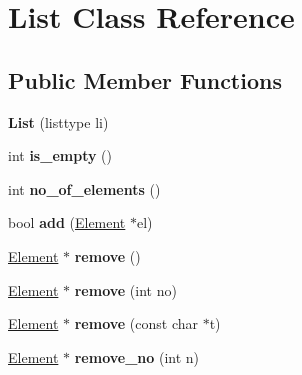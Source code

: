 \hypertarget{class_list}{\section{List Class Reference}
\label{d1/d34/class_list}
}
\subsection*{Public Member Functions}
\begin{DoxyCompactItemize}
\item 
\hypertarget{class_list_afd7e4e5bbb9551737d314733718443e3}{{\bfseries List} (listtype li)}\label{d1/d34/class_list_afd7e4e5bbb9551737d314733718443e3}

\item 
\hypertarget{class_list_a52c58a2f1cbbc8f6b5be599d36650b92}{int {\bfseries is\-\_\-empty} ()}\label{d1/d34/class_list_a52c58a2f1cbbc8f6b5be599d36650b92}

\item 
\hypertarget{class_list_a15316f30a5a14a6ab3cded1bbb3a7cf2}{int {\bfseries no\-\_\-of\-\_\-elements} ()}\label{d1/d34/class_list_a15316f30a5a14a6ab3cded1bbb3a7cf2}

\item 
\hypertarget{class_list_a0c68e2a53bf6f62b8776b6452e033285}{bool {\bfseries add} (\hyperlink{class_element}{Element} $\ast$el)}\label{d1/d34/class_list_a0c68e2a53bf6f62b8776b6452e033285}

\item 
\hypertarget{class_list_a140f49178e342df457c44cf5adcb4251}{\hyperlink{class_element}{Element} $\ast$ {\bfseries remove} ()}\label{d1/d34/class_list_a140f49178e342df457c44cf5adcb4251}

\item 
\hypertarget{class_list_a08d3e1577f17dc433376f822e3003b88}{\hyperlink{class_element}{Element} $\ast$ {\bfseries remove} (int no)}\label{d1/d34/class_list_a08d3e1577f17dc433376f822e3003b88}

\item 
\hypertarget{class_list_ac0808e64bb3ce2ee624c3c45c8db48d2}{\hyperlink{class_element}{Element} $\ast$ {\bfseries remove} (const char $\ast$t)}\label{d1/d34/class_list_ac0808e64bb3ce2ee624c3c45c8db48d2}

\item 
\hypertarget{class_list_aa80d82f65f222e774848aa845f4821a6}{\hyperlink{class_element}{Element} $\ast$ {\bfseries remove\-\_\-no} (int n)}\label{d1/d34/class_list_aa80d82f65f222e774848aa845f4821a6}


\end{DoxyCompactItemize}
